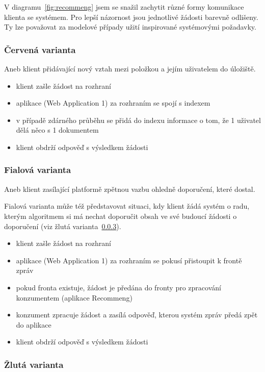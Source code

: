 \documentclass[thesis=M,czech]{FITthesis}[2014/05/07]
\begin{document}
V diagramu~\ref{fig:recommeng} jsem se snažil zachytit různé formy komunikace klienta se systémem. Pro lepší názornost jsou jednotlivé žádosti barevně odlišeny. Ty lze považovat za modelové případy užití inspirované systémovými požadavky.

\subsubsection{Červená varianta}

Aneb klient přidávající nový vztah mezi položkou a jejím uživatelem do úložiště.

\begin{itemize}
	\item klient zašle žádost na rozhraní
	\item aplikace (Web Application 1) za rozhraním se spojí s indexem
	\item v případě zdárného průběhu se přidá do indexu informace o tom, že 1 uživatel dělá něco s 1 dokumentem
	\item klient obdrží odpověď s výsledkem žádosti
\end{itemize}

\subsubsection{Fialová varianta}
\label{subsub:purple}

Aneb klient zasílající platformě zpětnou vazbu ohledně doporučení, které dostal.

Fialová varianta může též představovat situaci, kdy klient žádá systém o radu, kterým algoritmem si má nechat doporučit obsah ve své budoucí žádosti o doporučení (viz žlutá varianta~\ref{subsub:yellow}).

\begin{itemize}
	\item klient zašle žádost na rozhraní
	\item aplikace (Web Application 1) za rozhraním se pokusí přistoupit k frontě zpráv
	\item pokud fronta existuje, žádost je předána do fronty pro zpracování konzumentem (aplikace Recommeng)
	\item konzument zpracuje žádost a zasílá odpověď, kterou systém zpráv předá zpět do aplikace
	\item klient obdrží odpověď s výsledkem žádosti
\end{itemize}

\subsubsection{Žlutá varianta}
\label{subsub:yellow}
\end{document}
